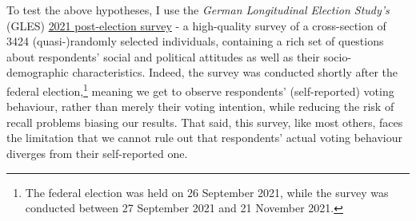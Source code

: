 \documentclass[
]{article}
\begin{document}
To test the above hypotheses, I use the \emph{German Longitudinal
Election Study's} (GLES)
\href{https://search.gesis.org/research_data/ZA7701}{2021 post-election
survey} - a high-quality survey of a cross-section of 3424
(quasi-)randomly selected individuals, containing a rich set of
questions about respondents' social and political attitudes as well as
their socio-demographic characteristics. Indeed, the survey was
conducted shortly after the federal election,\footnote{The federal
  election was held on 26 September 2021, while the survey was conducted
  between 27 September 2021 and 21 November 2021.} meaning we get to
observe respondents' (self-reported) voting behaviour, rather than
merely their voting intention, while reducing the risk of recall
problems biasing our results. That said, this survey, like most others,
faces the limitation that we cannot rule out that respondents' actual
voting behaviour diverges from their self-reported one.
\end{document}
